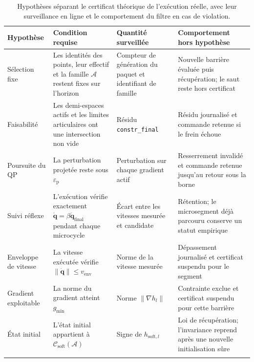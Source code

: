 \begin{table}[htbp]
\centering
\caption[Surveillance en ligne des hypothèses du certificat]{Hypothèses séparant le certificat théorique de l'exécution réelle, avec leur surveillance en ligne et le comportement du filtre en cas de violation.}
\label{tab:hypotheses_certificat}
\footnotesize
\begin{tabular}{>{\raggedright\arraybackslash}p{2.5cm}>{\raggedright\arraybackslash}p{3.8cm}>{\raggedright\arraybackslash}p{3.2cm}>{\raggedright\arraybackslash}p{4.1cm}}
\hline
Hypothèse & Condition requise & Quantité surveillée & Comportement hors hypothèse \\ \hline
Sélection fixe & Les identités des points, leur effectif et la famille $\mathcal{A}$ restent fixes sur l'horizon & Compteur de génération du paquet et identifiant de famille & Nouvelle barrière évaluée puis récupération; le saut reste hors certificat \\ \addlinespace[0.2em] \hline \addlinespace[0.2em]
Faisabilité & Les demi-espaces actifs et les limites articulaires ont une intersection non vide & Résidu \texttt{constr\_final} & Résidu journalisé et commande retenue si le frein échoue \\ \addlinespace[0.2em] \hline \addlinespace[0.2em]
Poursuite du QP & La perturbation projetée reste sous $\varepsilon_{\mathrm{p}}$ & Perturbation sur chaque gradient actif & Resserrement invalidé et commande retenue jusqu'au retour sous la borne \\ \addlinespace[0.2em] \hline \addlinespace[0.2em]
Suivi réflexe & L'exécution vérifie exactement $\dot{\mathbf{q}}=\beta\dot{\mathbf{q}}_{\mathrm{final}}$ pendant chaque microcycle & Écart entre les vitesses mesurée et candidate & Rétention; le microsegment déjà parcouru conserve un statut empirique \\ \addlinespace[0.2em] \hline \addlinespace[0.2em]
Enveloppe de vitesse & La vitesse exécutée vérifie $\|\dot{\mathbf{q}}\|\leq v_{\mathrm{env}}$ & Norme de la vitesse mesurée & Dépassement journalisé et certificat suspendu pour le segment \\ \addlinespace[0.2em] \hline \addlinespace[0.2em]
Gradient exploitable & La norme du gradient atteint $g_{\min}$ & Norme $\|\nabla h_l\|$ & Contrainte exclue et certificat suspendu pour cette barrière \\ \addlinespace[0.2em] \hline \addlinespace[0.2em]
État initial & L'état initial appartient à $\mathcal{C}_{\mathrm{soft}}(\mathcal{A})$ & Signe de $h_{\mathrm{soft},l}$ & Loi de récupération; l'invariance reprend après une nouvelle initialisation sûre \\ \addlinespace[0.2em] \hline \addlinespace[0.2em]

\end{tabular}
\end{table}

